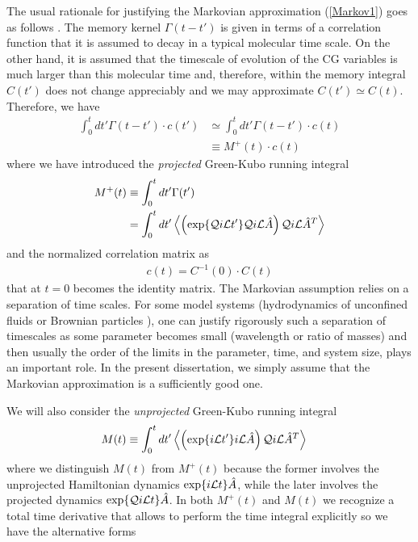 \documentclass[b5paper,openright,10pt]{book}
\newcommand{\esc}{\!\cdot\!}
\newcommand{\llangle}{\left\langle}
\newcommand{\rrangle}{\right\rangle}
\begin{document}
The  usual  rationale  for   justifying  the  Markovian  approximation
(\ref{Markov1})  goes  as  follows  \cite{Grabert1982,Kubo1991}.   The
memory  kernel  $\Gamma(t-t')$ is  given  in  terms of  a  correlation
function  that it  is assumed  to decay  in a  typical molecular  time
scale.   On the  other hand,  it  is assumed  that the  timescale  of
evolution of the CG variables is  much larger than this molecular time
and, therefore,  within the  memory integral  $C(t')$ does  not change
appreciably and we may  approximate $C(t')\simeq C(t)$.  Therefore, we
have
\begin{align}
  \int_0^tdt' \Gamma(t-t')\esc c(t')&\simeq  \int_0^tdt' \Gamma(t-t')\esc  c(t)
\nonumber\\
&\equiv
M^+(t)\esc c(t)
\label{M+c}
\end{align}
where we have introduced the \textit{projected} Green-Kubo running integral
\begin{align}
M^+(t)&\equiv  \int_0^tdt' \Gamma(t') 
\nonumber\\
& =\int_0^tdt' \llangle \left(\exp\{{\cal Q}i{\cal   L}t'\}{\cal Q}i{\cal L}\hat{A} \right){\cal Q} i{\cal L}\hat{A}^T\rrangle 
\label{Mt}
\end{align}
and the normalized correlation matrix as
\begin{align}
  c(t)=C^{-1}(0)\esc C(t)
\label{cnorm}
\end{align}
that  at $t=0$  becomes  the identity  matrix.   The  Markovian
  assumption relies  on a  separation of time  scales. For  some model
  systems  (hydrodynamics of  unconfined  fluids \cite{Selwyn1971}  or
  Brownian  particles \cite{Mazur1970}),  one  can justify  rigorously
  such a  separation of  timescales as  some parameter  becomes small
  (wavelength or  ratio of masses) and  then usually the order  of the
  limits in the  parameter, time, and system size,  plays an important
  role.  In the  present dissertation,  we simply  assume that  the Markovian
  approximation is a sufficiently good one.


We will also consider
the \textit{unprojected} Green-Kubo running integral
\begin{align}
M(t)&\equiv  \int_0^{t} dt' \llangle \left(\exp\{i{\cal   L}t'\}i{\cal L}\hat{A} \right){\cal Q} i{\cal L}\hat{A}^T\rrangle
\label{Mtau}
\end{align}
where we distinguish $M(t)$ from  $M^+(t)$ because the former involves
the  unprojected  Hamiltonian  dynamics  $\exp\{i{\cal  L}t\}\hat{A}$,
while the later involves  the projected dynamics $\exp\{{\cal Q}i{\cal
  L}t\}\hat{A}$.  In  both $M^+(t)$  and $M(t)$  we recognize  a total
time derivative that allows to perform the time integral explicitly so
we have the alternative forms
\end{document}
